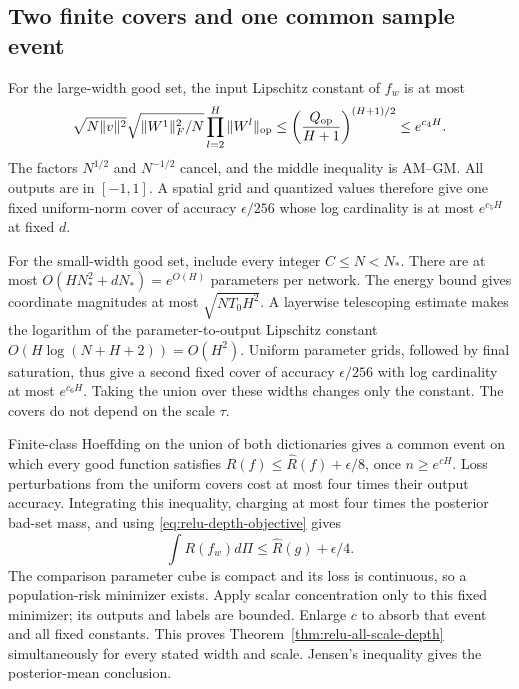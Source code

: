 \subsection{Two finite covers and one common sample event}
For the large-width good set, the input Lipschitz constant of $f_w$ is at most
\[
 \sqrt{N\|v\|^2}\sqrt{\|W^1\|_F^2/N}
       \prod_{l=2}^H\|W^l\|_{\mathrm{op}}
 \le\left(\frac{Q_{\mathrm{op}}}{H+1}\right)^{(H+1)/2}
 \le e^{c_4H}.
\]
The factors $N^{1/2}$ and $N^{-1/2}$ cancel, and the middle inequality is AM--GM. All outputs are in $[-1,1]$. A spatial grid and quantized values therefore give one fixed uniform-norm cover of accuracy $\epsilon/256$ whose log cardinality is at most $e^{c_5H}$ at fixed $d$.

For the small-width good set, include every integer $C\le N<N_*$. There are at most
$O(HN_*^2+dN_*)=e^{O(H)}$ parameters per network. The energy bound gives coordinate magnitudes at most $\sqrt{NT_0H^2}$. A layerwise telescoping estimate makes the logarithm of the parameter-to-output Lipschitz constant $O(H\log(N+H+2))=O(H^2)$. Uniform parameter grids, followed by final saturation, thus give a second fixed cover of accuracy $\epsilon/256$ with log cardinality at most $e^{c_6H}$. Taking the union over these widths changes only the constant. The covers do not depend on the scale $\tau$.

Finite-class Hoeffding on the union of both dictionaries gives a common event on which every good function satisfies
$R(f)\le\widehat R(f)+\epsilon/8$, once $n\ge e^{cH}$. Loss perturbations from the uniform covers cost at most four times their output accuracy. Integrating this inequality, charging at most four times the posterior bad-set mass, and using \eqref{eq:relu-depth-objective} gives
\[
 \int R(f_w)d\Pi\le\widehat R(g)+\epsilon/4.
\]
The comparison parameter cube is compact and its loss is continuous, so a population-risk minimizer exists. Apply scalar concentration only to this fixed minimizer; its outputs and labels are bounded. Enlarge $c$ to absorb that event and all fixed constants. This proves Theorem~\ref{thm:relu-all-scale-depth} simultaneously for every stated width and scale. Jensen's inequality gives the posterior-mean conclusion.
